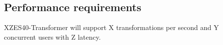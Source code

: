 \subsection{Performance requirements}
%


XZES40-Transformer will support X transformations per second and Y concurrent users with Z latency.
    
